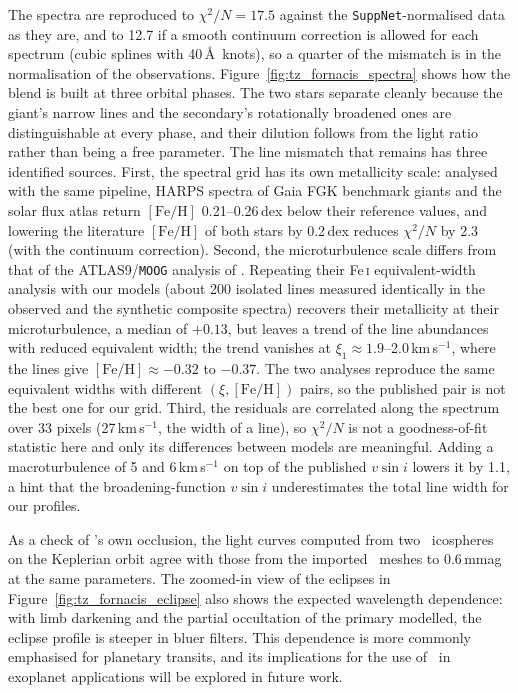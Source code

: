 The spectra are reproduced to $\chi^2/N = 17.5$ against the \texttt{SuppNet}-normalised data as they are,
and to 12.7 if a smooth continuum correction is allowed for each spectrum (cubic splines with 40\,\AA\
knots), so a quarter of the mismatch is in the normalisation of the observations.
Figure~\ref{fig:tz_fornacis_spectra} shows how the blend is built at three orbital phases. The two stars
separate cleanly because the giant's narrow lines and the secondary's rotationally broadened ones are
distinguishable at every phase, and their dilution follows from the light ratio rather than being a free
parameter. The line mismatch that remains has three identified sources. First, the spectral grid has its
own metallicity scale: analysed with the same pipeline, HARPS spectra of Gaia FGK benchmark giants and
the solar flux atlas return $[\mathrm{Fe/H}]$ 0.21--0.26\,dex below their reference values, and lowering
the literature $[\mathrm{Fe/H}]$ of both stars by 0.2\,dex reduces $\chi^2/N$ by 2.3 (with the continuum
correction). Second, the microturbulence scale differs from that of the ATLAS9/\texttt{MOOG} analysis of
\citet{tz_fornacis_orbit}. Repeating their Fe\,\textsc{i} equivalent-width analysis with our models
(about 200 isolated lines measured identically in the observed and the synthetic composite spectra)
recovers their metallicity at their microturbulence, a median of $+0.13$, but leaves a trend of the line
abundances with reduced equivalent width; the trend vanishes at $\xi_1 \approx 1.9$--2.0\,km\,s$^{-1}$,
where the lines give $[\mathrm{Fe/H}] \approx -0.32$ to $-0.37$. The two analyses reproduce the same
equivalent widths with different $(\xi, [\mathrm{Fe/H}])$ pairs, so the published pair is not the best one
for our grid. Third, the residuals are correlated along the spectrum over 33 pixels (27\,km\,s$^{-1}$, the
width of a line), so $\chi^2/N$ is not a goodness-of-fit statistic here and only its differences between
models are meaningful. Adding a macroturbulence of 5 and 6\,km\,s$^{-1}$ on top of the published
$v\sin i$ lowers it by 1.1, a hint that the broadening-function $v\sin i$ underestimates the total line
width for our profiles.

As a check of \spice's own occlusion, the light curves computed from two \spice\ icospheres on the
Keplerian orbit agree with those from the imported \phoebe\ meshes to 0.6\,mmag at the same parameters.
The zoomed-in view of the eclipses in Figure~\ref{fig:tz_fornacis_eclipse} also shows the expected
wavelength dependence: with limb darkening and the partial occultation of the primary modelled, the
eclipse profile is steeper in bluer filters. This dependence is more commonly emphasised for planetary
transits, and its implications for the use of \spice\ in exoplanet applications will be explored in
future work.

